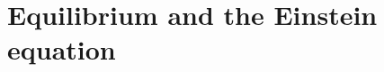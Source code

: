 \documentclass[aps,prd,showpacs,groupedaddress,nofootinbib,longbibliography,12pt]{revtex4-1}
\def\beq{\begin{equation}}
\def\eeq{\end{equation}}
\def\la{\langle}
\def\ra{\rangle}
\def\d{\delta}\def\D{\Delta}
\def\O{\Omega}
\begin{document}
 



\section{Equilibrium and the Einstein equation}
\end{document}
